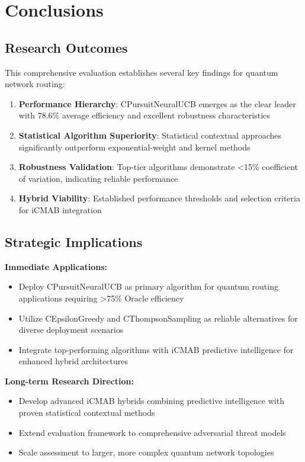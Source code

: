 \documentclass[12pt,a4paper]{article}
\newcommand{\primarytext}[1]{\textcolor{primaryblue}{\textbf{#1}}}
\newcommand{\secondarytext}[1]{\textcolor{secondaryblue}{\textbf{#1}}}
\newcommand{\success}[1]{\textcolor{accentgreen}{\textbf{#1}}}
\begin{document}
\section{Conclusions}

\subsection{Research Outcomes}

This comprehensive evaluation establishes several key findings for quantum network routing:

\begin{enumerate}
\item \primarytext{Performance Hierarchy}: CPursuitNeuralUCB emerges as the clear leader with 78.6\% average efficiency and excellent robustness characteristics
\item \success{Statistical Algorithm Superiority}: Statistical contextual approaches significantly outperform exponential-weight and kernel methods
\item \secondarytext{Robustness Validation}: Top-tier algorithms demonstrate <15\% coefficient of variation, indicating reliable performance
\item \textbf{Hybrid Viability}: Established performance thresholds and selection criteria for iCMAB integration
\end{enumerate}

\subsection{Strategic Implications}

\textbf{Immediate Applications:}
\begin{itemize}
\item Deploy CPursuitNeuralUCB as primary algorithm for quantum routing applications requiring >75\% Oracle efficiency
\item Utilize CEpsilonGreedy and CThompsonSampling as reliable alternatives for diverse deployment scenarios
\item Integrate top-performing algorithms with iCMAB predictive intelligence for enhanced hybrid architectures
\end{itemize}

\textbf{Long-term Research Direction:}
\begin{itemize}
\item Develop advanced iCMAB hybrids combining predictive intelligence with proven statistical contextual methods
\item Extend evaluation framework to comprehensive adversarial threat models
\item Scale assessment to larger, more complex quantum network topologies
\end{itemize}
\end{document}
